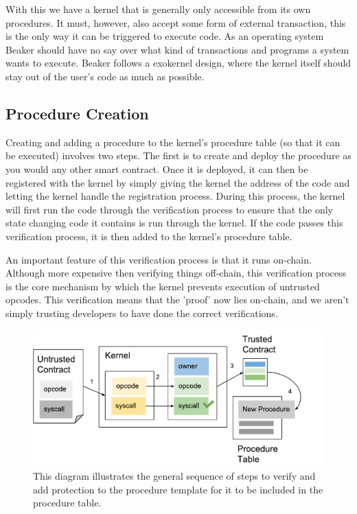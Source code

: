 \documentclass[english,a4paper]{article}
\begin{document}
With this we have a kernel that is generally only accessible from its
own procedures. It must, however, also accept some form of external
transaction, this is the only way it can be triggered to execute code.
As an operating system Beaker should have no say over what kind of
transactions and programs a system wants to execute. Beaker follows a
exokernel design, where the kernel itself should stay out of the user's
code as much as possible.

\subsection{Procedure Creation}\label{procedure-creation}
Creating and adding a procedure to the kernel's procedure table (so that it can
be executed) involves two steps. The first is to create and deploy the procedure
as you would any other smart contract. Once it is deployed, it can then be
registered with the kernel by simply giving the kernel the address of the code
and letting the kernel handle the registration process. During this process, the
kernel will first run the code through the verification process to ensure that
the only state changing code it contains is run through the kernel. If the code
passes this verification process, it is then added to the kernel's procedure
table.

An important feature of this verification process is that it runs on-chain.
Although more expensive then verifying things off-chain, this verification
process is the core mechanism by which the kernel prevents execution of
untrusted opcodes. This verification means that the 'proof' now lies on-chain,
and we aren't simply trusting developers to have done the correct verifications.

\begin{figure}[htbp]
\centering
\includegraphics[width=1\textwidth]{media/ProcedureCreation.pdf}
\caption{This diagram illustrates the general sequence of steps to
verify and add protection to the procedure template for it to be
included in the procedure table.}
\end{figure}
\end{document}
